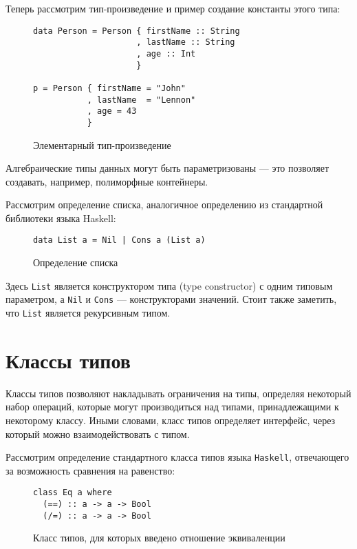 Теперь рассмотрим тип-произведение и пример создание константы этого типа:

\begin{figure}[h]
\begin{lstlisting}
data Person = Person { firstName :: String
                     , lastName :: String
                     , age :: Int
                     }

p = Person { firstName = "John"
           , lastName  = "Lennon"
           , age = 43
           }
\end{lstlisting}
\caption{Элементарный тип-произведение}
\label{listing:Bool}
\end{figure}

Алгебраические типы данных могут быть параметризованы --- это позволяет
создавать, например, полиморфные контейнеры.

Рассмотрим определение списка, аналогичное определению из стандартной библиотеки
языка Haskell:

\begin{figure}[h]
\begin{lstlisting}
data List a = Nil | Cons a (List a)
\end{lstlisting}
\caption{Определение списка}
\label{listing:List}
\end{figure}

Здесь \lstinline{List} является конструктором типа (type constructor) с одним
типовым параметром, а \lstinline{Nil} и \lstinline{Cons} --- конструкторами
значений. Стоит также заметить, что \lstinline{List} является рекурсивным типом.

\section{Классы типов}

Классы типов позволяют накладывать ограничения на типы, определяя некоторый
набор операций, которые могут производиться над типами, принадлежащими к
некоторому классу. Иными словами, класс типов определяет интерфейс,
через который можно взаимодействовать с типом.

Рассмотрим определение стандартного класса типов языка \lstinline{Haskell},
отвечающего за возможность сравнения на равенство:

\begin{figure}[h]
\begin{lstlisting}
class Eq a where
  (==) :: a -> a -> Bool
  (/=) :: a -> a -> Bool
\end{lstlisting}
\caption{Класс типов, для которых введено отношение эквиваленции}
\label{listing:Eq}
\end{figure}

